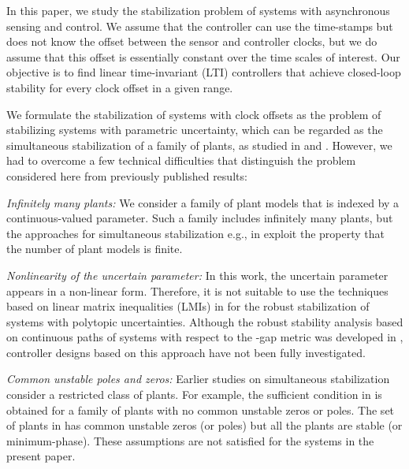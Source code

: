 \documentclass[letterpaper, 12pt, draftcls, onecolumn]{ieeeconf}
\begin{document}
In this paper, we study the stabilization problem of
systems with asynchronous sensing and control.
We assume that
the controller can use the time-stamps but does not know
the offset between
the sensor and controller clocks, but
we do assume that this offset is essentially constant over the time
scales of interest.
Our objective is to find linear time-invariant (LTI) controllers 
that achieve closed-loop stability
for every clock offset in a given range.





We formulate the stabilization of systems with clock offsets as the problem
of stabilizing systems with parametric uncertainty,
which can be regarded as the
simultaneous stabilization of a family of plants, as 
studied in \cite[Sec. 5.4]{vidyasagar1985} and
\cite{Vidyasagar1982}.
However, we had to overcome a few technical difficulties that distinguish the problem considered here from previously published results:

{\it Infinitely many plants:}
We consider a family of plant models that is indexed by 
a continuous-valued parameter.
Such a family
includes infinitely many plants, but
the approaches for simultaneous stabilization 
e.g., in \cite{Shi2009}
exploit the property that the number of plant models is finite.

{\it Nonlinearity of the uncertain parameter:}
In this work, 
the uncertain parameter appears in a non-linear form.
Therefore, it is not suitable to use the techniques 
based on linear matrix inequalities (LMIs) in 
\cite{Oliveira1999}
for the robust stabilization
of systems with polytopic uncertainties.
Although the robust stability analysis based on continuous paths of
systems with respect to the -gap metric
was developed in \cite{Cantoni2012},
controller designs based on this approach have not been fully investigated.

{\it Common unstable poles and zeros:}
Earlier studies on simultaneous stabilization consider
a restricted class of plants.
For example, 
the sufficient condition 
in \cite{Blondel1993Suf}
is obtained for a family of plants with
no common unstable zeros or poles. 
The set of plants in \cite{Maeda1984} has
common unstable zeros (or poles) but
all the plants are stable (or minimum-phase).
These assumptions are not satisfied for the systems 
in the present paper.
\end{document}
